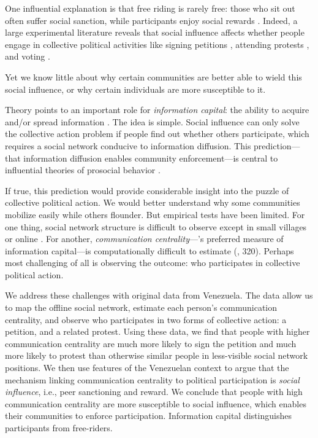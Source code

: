 \documentclass[12pt]{article}
\begin{document}
One influential explanation is that free riding is rarely free: those who sit out often suffer social sanction, while participants enjoy social rewards \citep{Ostrom:1990ws}. Indeed, a large experimental literature reveals that social influence affects whether people engage in collective political activities like signing petitions \citep{PalerPetition}, attending protests \citep{EnikopolovProtestExp}, and voting \citep{NickersonAPSR, Gerber:2008ks,Gerber:2016cs,Panagopoulos:2010kt}.

Yet we know little about why certain communities are better able to wield this social influence, or why certain individuals are more susceptible to it.

Theory points to an important role for \emph{information capital}: the ability to acquire and/or spread information \citep[][318]{JacksonTypology}. The idea is simple. Social influence can only solve the collective action problem if people find out whether others participate, which requires a social network conducive to information diffusion. This prediction---that information diffusion enables community enforcement---is central to influential theories of prosocial behavior \citep[][75]{Larson:2014ve, wolitzky2012, JacksonJEL}.

If true, this prediction would provide considerable insight into the puzzle of collective political action. We would better understand why some communities mobilize easily while others flounder. But empirical tests have been limited. For one thing, social network structure is difficult to observe except in small villages \citep{Larson:2016uz,LarsonLewisPSRM,Eubank:2018,FerraliUganda} or online \citep{Larson2017,SteinertThrelkeld:2017dy}. For another, \emph{communication centrality}---\citeauthor{JacksonTypology}'s preferred measure of information capital---is computationally difficult to estimate (\citeyear{JacksonTypology}, 320). Perhaps most challenging of all is observing the outcome: who participates in collective political action.

We address these challenges with original data from Venezuela. The data allow us to map the offline social network, estimate each person's communication centrality, and observe who participates in two forms of collective action: a petition, and a related protest. Using these data, we find that people with higher communication centrality are much more likely to sign the petition and much more likely to protest than otherwise similar people in less-visible social network positions. We then use features of the Venezuelan context to argue that the mechanism linking communication centrality to political participation is \emph{social influence}, i.e., peer sanctioning and reward. We conclude that people with high communication centrality are more susceptible to social influence, which enables their communities to enforce participation. Information capital distinguishes participants from free-riders.
\end{document}
